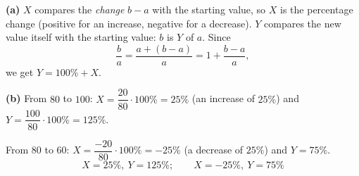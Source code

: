 \textbf{(a)} $X$ compares the \emph{change} $b-a$ with the starting value, so $X$ is the percentage change (positive for an increase, negative for a decrease). $Y$ compares the new value itself with the starting value: $b$ is $Y$ of $a$. Since
\[\dfrac ba=\dfrac{a+(b-a)}{a}=1+\dfrac{b-a}{a},\]
we get $Y=100\%+X$.

\textbf{(b)} From $80$ to $100$: $X=\dfrac{20}{80}\cdot100\%=25\%$ (an increase of $25\%$) and $Y=\dfrac{100}{80}\cdot100\%=125\%$.

From $80$ to $60$: $X=\dfrac{-20}{80}\cdot100\%=-25\%$ (a decrease of $25\%$) and $Y=75\%$.
\[\boxed{X=25\%,\ Y=125\%;\qquad X=-25\%,\ Y=75\%}\]
